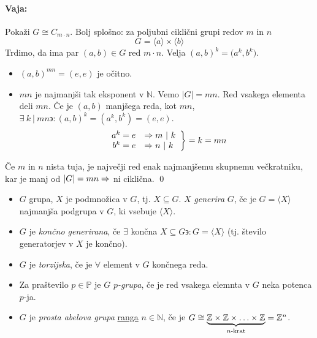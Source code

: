 \begin{enumerate}
{		\paragraph{Vaja:} Poka\v zi $G \cong C_{m \cdot n}$. Bolj splo\v sno: za poljubni cikli\v cni grupi redov $m$ in $n$
		\[
			G = \langle a \rangle \times \langle b \rangle
		\]
		\ni Trdimo, da ima par $(a, b) \in G$ red $m \cdot n$. Velja $(a,b)^k = \big(a^k, b^k\big)$.
		\begin{itemize}
			\item{$(a, b)^{mn} = (e, e)$ je o\v citno.}
			\item{$mn$ je najmanj\v si tak eksponent v $\mathbb{N}$. Vemo $|G| = mn$. Red vsakega elementa deli $mn$. \v Ce je
				$(a, b)$ manj\v sega reda, kot $mn$, $\exists\ k\ |\ mn \backepsilon: (a,b)^k = (a^k, b^k) = (e, e)$.
				\[
					\left .
					\begin{array}{rl}
						a^k = e &\Rightarrow m\ |\ k \\
						b^k = e &\Rightarrow n\ |\ k
					\end{array}\right\} = k = mn
				\]}
		\end{itemize}
		\v Ce $m$ in $n$ nista tuja, je najve\v cji red enak najmanj\v semu skupnemu ve\v ckratniku, kar je manj od $|G| = mn \Rightarrow$ ni cikli\v cna.
		\qed
	}
\end{enumerate}

\begin{defin}
	\begin{itemize}
		\item{$G$ grupa, $X$ je podmno\v zica v $G$, tj. $X \subseteq G$. $X$ \emph{generira} $G$, \v ce je $G = \langle X \rangle$ najmanj\v sa podgrupa
			v $G$, ki vsebuje $\langle X \rangle$.}
		\item{$G$ je \emph{kon\v cno generirana}, \v ce $\exists$ kon\v cna $X \subseteq G \backepsilon: G = \langle X \rangle$ (tj. \v stevilo generatorjev v $X$ je
			kon\v cno).}
		\item{$G$ je \emph{torzijska}, \v ce je $\forall$ element v $G$ kon\v cnega reda.}
		\item{Za pra\v stevilo $p \in \mathbb{P}$ je $G$ \emph{$p$-grupa}, \v ce je red vsakega elemnta v $G$ neka potenca $p$-ja.}
		\item{$G$ je \emph{prosta abelova grupa} \underline{ranga} $n \in \mathbb{N}$, \v ce je $G \cong \underbrace{\mathbb{Z} \times \mathbb{Z} \times \ldots \times \mathbb{Z}}_\text{$n$-krat} = \mathbb{Z}^n$.}
	\end{itemize}
\end{defin}

